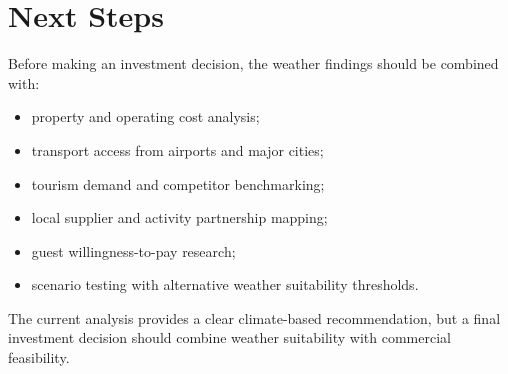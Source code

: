 \documentclass[11pt,a4paper]{article}
\begin{document}
\section{Next Steps}

Before making an investment decision, the weather findings should be combined with:

\begin{itemize}[leftmargin=*]
    \item property and operating cost analysis;
    \item transport access from airports and major cities;
    \item tourism demand and competitor benchmarking;
    \item local supplier and activity partnership mapping;
    \item guest willingness-to-pay research;
    \item scenario testing with alternative weather suitability thresholds.
\end{itemize}

The current analysis provides a clear climate-based recommendation, but a final investment decision should combine weather suitability with commercial feasibility.
\end{document}
